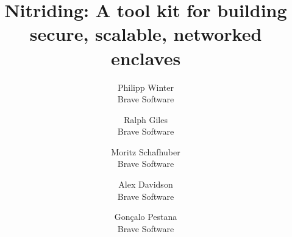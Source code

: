 \documentclass[letterpaper,twocolumn,10pt]{article}
\begin{document}
\title{\Large \bf Nitriding: A tool kit for building\\secure, scalable, networked enclaves}

\author{
  {\rm Philipp Winter} \\
  Brave Software
  \and
  {\rm Ralph Giles} \\
  Brave Software
  \and
  {\rm Moritz Schafhuber} \\
  Brave Software
  \and
  {\rm Alex Davidson} \\
  Brave Software
  \and
  {\rm Gonçalo Pestana} \\
  Brave Software
}

\maketitle












\balance
\printbibliography
\end{document}
